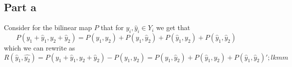 \documentclass[12pt]{report}
\begin{document}
\subsection*{Part a}
Consider for the bilinear map $P$ that for $y_i,\hat{y}_i \in Y_i$ we get that
\begin{equation*}
  P(y_1 + \hat{y}_1, y_2 + \hat{y}_2) = P(y_1,y_2) + P(y_1,\hat{y}_2) + P(\hat{y}_1,y_2) + P(\hat{y}_1,\hat{y}_2)
\end{equation*}
which we can rewrite as
\begin{equation*}
  R(\hat{y}_1,\hat{y_2}) =P(y_1 + \hat{y}_1, y_2 + \hat{y}_2) - P(y_1,y_2) = P(y_1,\hat{y}_2) + P(\hat{y}_1,y_2) + P(\hat{y}_1,\hat{y}_2)';lkmm 
\end{equation*}
\end{document}

